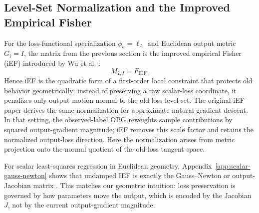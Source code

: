 \subsection{Level-Set Normalization and the Improved Empirical Fisher}

For the loss-functional specialization $\phi_a=\ell_A$ and Euclidean output metric $G_i=I$, the matrix from the previous section is the improved empirical Fisher (iEF) introduced by Wu et al. \citep{IEF}:
\[
M_{2,I}=F_{\mathrm{IEF}}.
\]
Hence iEF is the quadratic form of a first-order local constraint that protects old behavior geometrically: instead of preserving a raw scalar-loss coordinate, it penalizes only output motion normal to the old loss level set. The original iEF paper derives the same normalization for approximate natural-gradient descent. In that setting, the observed-label OPG reweights sample contributions by squared output-gradient magnitude; iEF removes this scale factor and retains the normalized output-loss direction. Here the normalization arises from metric projection onto the normal quotient of the old-loss tangent space.

For scalar least-squares regression in Euclidean geometry, Appendix~\ref{app:scalar-gauss-newton} shows that undamped IEF is exactly the Gauss--Newton or output-Jacobian matrix \citep{GaussNewton,MartensHF,MartensNG,IEF}. This matches our geometric intuition: loss preservation is governed by how parameters move the output, which is encoded by the Jacobian $J$, not by the current output-gradient magnitude.
